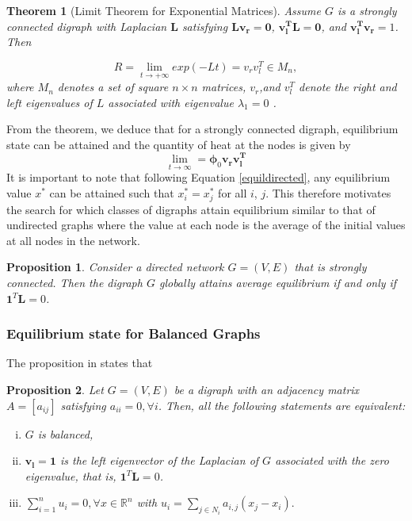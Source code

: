 \documentclass[10pt,a4paper]{article}
\newtheorem{thm}{Theorem}
\newtheorem{prop}{Proposition}
\begin{document}
        \begin{thm}[Limit Theorem for Exponential Matrices]
        	Assume $G$ is a strongly connected digraph with Laplacian $\mathbf{L}$ satisfying $\mathbf{L} \mathbf{v_r} = \mathbf{0}$, $\mathbf{v_{l} ^T} \mathbf{L} =\mathbf{0}$, and $\mathbf{v_{l} ^T} \mathbf{v_r}=1$. Then 
        	
        	\begin{equation}
        	 R = \lim_{t \longrightarrow +\infty} exp(-Lt) = v_r  v_{l} ^T \in M_n,
        	\end{equation}
        	where $M_n$ denotes a set of square $n\times n$ matrices, $v_r$,and $v_{l} ^T$ denote the right and left eigenvalues of $L$ associated with eigenvalue $\lambda_1 = 0$ \citep{saber2003agreement}.
        	\label{exponentialTheorem}
        \end{thm}
    From the theorem, we deduce that for a strongly connected digraph, equilibrium state can be attained and the quantity of heat at the nodes is given by
    \begin{equation}
    \lim_{t \longrightarrow \infty} =  \boldsymbol{\phi}_0  \mathbf{v_r}  \mathbf{v_{l} ^T}
    \label{equildirected}
    \end{equation}
    It is important to note that following Equation \ref{equildirected}, any equilibrium value $x^*$ can be attained such that $x^*_i =x^*_j$ for all $i$, $j$. This therefore motivates the search for which classes of digraphs attain equilibrium similar to that of undirected graphs where the value at each node is the average of the initial values at all nodes in the network.
    
    \begin{prop}
    Consider a directed network $G=(V,E)$ that is strongly connected. Then the digraph $G$ globally attains average equilibrium if and only if $\mathbf{1}^T \mathbf{L}= 0$.
    \label{prop1}
    \end{prop} 

    \subsubsection{Equilibrium state for Balanced Graphs}
     The proposition in \citep{saber2003agreement} states that 
     \begin{prop}
     Let $G=(V,E)$ be a digraph with an adjacency matrix $A=[a_{ij}]$ satisfying $a_{ii}=0, \forall i$. Then, all the following statements are equivalent:
     \begin{enumerate}[i)]
     	\item $G$ is balanced,
     	\item $\mathbf{v_l}= \mathbf{1}$ is the left eigenvector of the Laplacian of $G$ associated with the zero eigenvalue, that is, $\mathbf{1}^T \mathbf{L} = 0$.
     	\item $\sum_{i=1} ^ n u_i = 0, \forall x \in  \mathbb{R}^n$ with $u_i = \sum_{j \in N_i} a_{i,j} (x_j -x_i).$
     \end{enumerate}
     \label{prop1}
     \end{prop}
 
\end{document}
